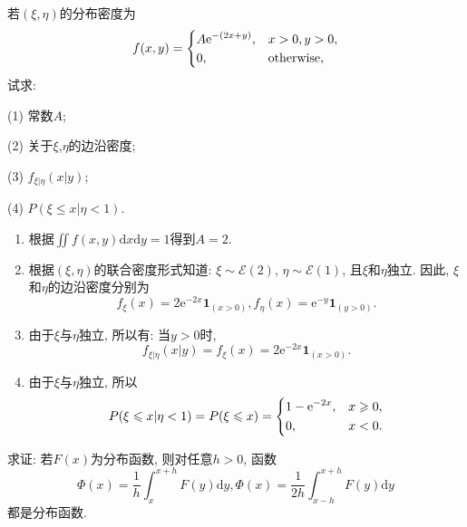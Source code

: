 \begin{yyEx}
	若$(\xi,\eta)$的分布密度为\begin{equation}
	f(x,y) = \begin{dcases}
	A\mathrm{e}^{-(2x+y)},&x>0,y>0,\\
	0,&\text{otherwise},
	\end{dcases}
	\end{equation}
	试求:\begin{blist}
		\item[(1)] 常数$A$;
		\item[(2)] 关于$\xi$,$\eta$的边沿密度;
		\item[(3)] $f_{\xi|\eta}(x|y)$;
		\item[(4)] $P(\xi\leqslant x|\eta<1)$.
	\end{blist}
\end{yyEx}

\begin{yySolution}
	\begin{enumerate}
	\item 根据$\iint f(x,y)\mathrm{d}x\mathrm{d}y = 1$得到$A = 2$.
	\item 
	根据$(\xi,\eta)$的联合密度形式知道: $\xi\sim \mathcal{E}(2)$, $\eta\sim \mathcal{E}(1)$, 
	且$\xi$和$\eta$独立. 因此, $\xi$和$\eta$的边沿密度分别为
	\begin{equation}
		f_{\xi}(x) = 2\mathrm{e}^{-2x}\bm{1}_{(x>0)},f_{\eta}(x) = \mathrm{e}^{-y}\bm{1}_{(y>0)}.
	\end{equation}
	\item 由于$\xi$与$\eta$独立, 所以有: 当$y>0$时,
	\begin{equation}
		f_{\xi|\eta}(x|y) = f_{\xi}(x) = 2\mathrm{e}^{-2x}\bm{1}_{(x>0)}.
		\end{equation}
	\item 由于$\xi$与$\eta$独立, 所以\begin{equation}
		P(\xi\leqslant x|\eta<1) = P(\xi\leqslant x) = \begin{dcases}
			1-\mathrm{e}^{-2x},&x\geqslant 0,\\
			0, &x<0.
		\end{dcases}
	\end{equation}
	\end{enumerate}
\end{yySolution}

\begin{yyEx}
	求证: 若$F(x)$为分布函数, 则对任意$h>0$, 函数
	\begin{equation}
	\varPhi(x) = \frac{1}{h}\int_{x}^{x+h}F(y)\mathrm{d}y,
	\varPhi(x) = \frac{1}{2h}\int_{x-h}^{x+h}F(y)\mathrm{d}y
	\end{equation}
	都是分布函数.
\end{yyEx}

